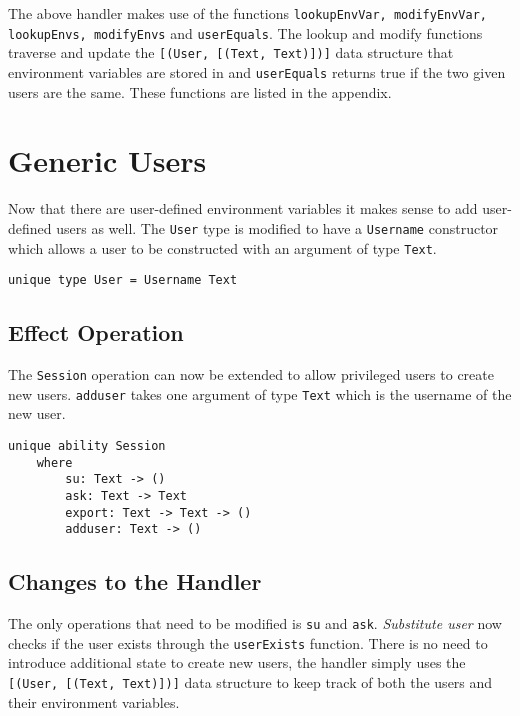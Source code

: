 \documentclass[logo,bsc,singlespacing,parskip]{infthesis}
\begin{document}
The above handler makes use of the functions \texttt{lookupEnvVar,
modifyEnvVar, lookupEnvs, modifyEnvs} and \texttt{userEquals}. The lookup and
modify functions traverse and update the \texttt{[(User, [(Text, Text)])]} data
structure that environment variables are stored in and \texttt{userEquals}
returns true if the two given users are the same. These functions are listed in
the appendix.

\section{Generic Users}
\label{genericusers}

Now that there are user-defined environment variables it makes sense to add
user-defined users as well. The \texttt{User} type is modified to have a
\texttt{Username} constructor which allows a user to be constructed with an
argument of type \texttt{Text}.

\begin{lstlisting}[language=unison]
unique type User = Username Text
\end{lstlisting}

\subsection{Effect Operation}

The \texttt{Session} operation can now be extended to allow privileged users to
create new users. \texttt{adduser} takes one argument of type \texttt{Text}
which is the username of the new user.

\begin{lstlisting}[language=unison]
unique ability Session
    where
        su: Text -> ()
        ask: Text -> Text
        export: Text -> Text -> ()
        adduser: Text -> ()
\end{lstlisting}

\subsection{Changes to the Handler}

The only operations that need to be modified is \texttt{su} and \texttt{ask}.
\emph{Substitute user} now checks if the user exists through the
\texttt{userExists} function. There is no need to introduce additional state to
create new users, the handler simply uses the \texttt{[(User, [(Text, Text)])]}
data structure to keep track of both the users and their environment variables.
\end{document}
